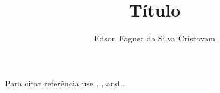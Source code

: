 \documentclass[12pt]{article}
\title{Título}
\author{Edson Fagner da Silva Cristovam \inst{1} }
\begin{document}
 

\maketitle

% 

% 
% 
% 
% 


Para citar referência use \cite{knuth:84}, \cite{boulic:91},  and \cite{smith:99}.



\end{document}
